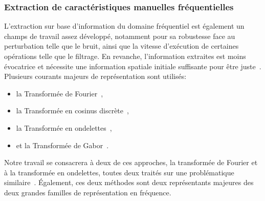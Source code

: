 \subsubsection{Extraction de caractéristiques manuelles fréquentielles}
L'extraction sur base d'information du domaine fréquentiel est également un champs de travail assez développé, notamment pour sa robustesse face au perturbation telle que le bruit, ainsi que la vitesse d'exécution de certaines opérations telle que le filtrage. En revanche, l'information extraites est moins évocatrice et nécessite une information spatiale initiale suffisante pour être juste~\cite{Kamila2015}. Plusieurs courants majeurs de représentation sont utilisés: 
\begin{itemize}
    \item la Transformée de Fourier~\cite{Ursani2007, Smach2008a},
    \item la Transformée en cosinus discrète~\cite{Sorwar2001},
    \item la Transformée en ondelettes~\cite{Arivazhagan2003,Hong2010},
    \item et la Transformée de Gabor~\cite{Ursani2007}.
\end{itemize}
Notre travail se consacrera à deux de ces approches, la transformée de Fourier et à la transformée en ondelettes, toutes deux traités sur une problématique similaire~\cite{Wiltgen2008,Halimi2017a,Halimi2017b}. Également, ces deux méthodes sont deux représentants majeures des deux grandes familles de représentation en fréquence.\par

